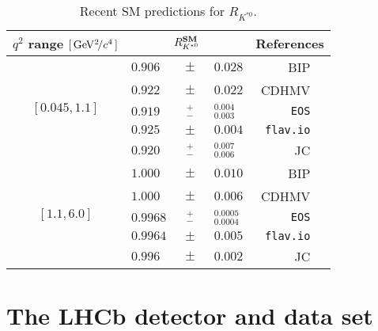 \documentclass[12pt,a4paper]{article}
\def\RKst    {\mbox{R_{\Kstarz}}}
\def\lhcb {\mbox{LHCb}\xspace}
\def\PK      {\ensuremath{\mathrm{K}}\xspace}
\def\PK      {\ensuremath{K}\xspace}
\def\kaon  {\ensuremath{\PK}\xspace}
\def\Kstarz  {\ensuremath{\kaon^{*0}}\xspace}
\def\qsq       {\ensuremath{q^2}\xspace}
\newcommand{\gevgevcccc}{\ensuremath{{\mathrm{\,Ge\kern -0.1em V^2\!/}c^4}}\xspace}
\def\RKst{\ensuremath{R_{\Kstarz}}\xspace}
\begin{document}
\begin{table}[t!]
\centering
\caption{Recent SM predictions for \RKst.}
\label{tab:predictions}
\renewcommand\arraystretch{1.4}
\begin{tabular}{c|l@{}c@{}l|r@{}l}
\qsq range $[\gevgevcccc\,]$ & \multicolumn{3}{c|}{$\RKst^{\textrm{\textbf{SM}}}$} & \multicolumn{2}{c}{References} \\
\hline
\multirow{5}{*}{$[0.045, 1.1]$}
& $0.906$				& $\pm$		& $\phantom{0}0.028$			& BIP & \cite{Bordone:2016gaq} \\
& $0.922$				& $\pm$		& $\phantom{0}0.022$			& CDHMV & \cite{Descotes-Genon:2015uva,Capdevila:2016ivx,Capdevila:2017ert} \\
& $0.919$				& $^{+}_{-}$	& $\phantom{0}^{0.004}_{0.003}$	& \texttt{EOS} & \cite{Serra:2016ivr,EOS-Web,*EOS} \\
& $0.925\phantom{00}$	& $\pm$		& $\phantom{0}0.004$			& \texttt{flav.io} & \cite{Straub:2015ica,Altmannshofer:2017fio,flavio} \\
& $0.920$				& $^{+}_{-}$	& $\phantom{0}^{0.007}_{0.006}$	& JC & \cite{Jager:2014rwa} \\
\hline
\multirow{5}{*}{$[1.1, 6.0]$}
& $1.000$				& $\pm$		& $\phantom{0}0.010$			& BIP & \cite{Bordone:2016gaq} \\
& $1.000$				& $\pm$		& $\phantom{0}0.006$			& CDHMV & \cite{Descotes-Genon:2015uva,Capdevila:2016ivx,Capdevila:2017ert} \\
& $0.9968$			& $^{+}_{-}$	& $\phantom{0}^{0.0005}_{0.0004}$	& \texttt{EOS} & \cite{Serra:2016ivr,EOS-Web,*EOS} \\
& $0.9964$			& $\pm$		& $\phantom{0}0.005$			& \texttt{flav.io} & \cite{Straub:2015ica,Altmannshofer:2017fio,flavio} \\
& $0.996$				& $\pm$		& $\phantom{0}{0.002}$			& JC & \cite{Jager:2014rwa} \\
\end{tabular}
\end{table}
 

\section{The \lhcb detector and data set}
\label{sec:Detector}
\end{document}

